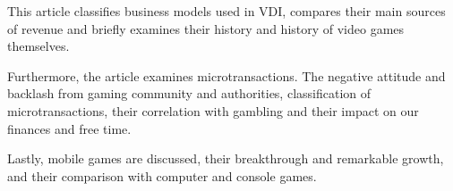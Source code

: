 \documentclass[10pt,british,a4paper,titlepage]{article}
\begin{document}
This article classifies business models used in VDI, compares their main sources of revenue and briefly examines their history and history of video games themselves. 

Furthermore, the article examines microtransactions. The negative attitude and backlash from gaming community and authorities, classification of microtransactions, their correlation with gambling and their impact on our finances and free time.  

Lastly, mobile games are discussed, their breakthrough and remarkable growth, and their comparison with computer and console games.   






\end{document}
